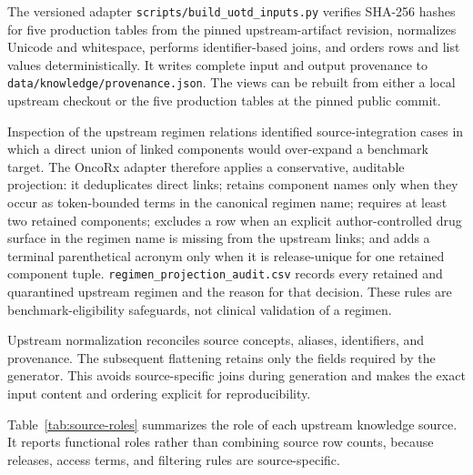 \documentclass[conference]{IEEEtran}
\newcommand{\code}[1]{\texttt{#1}}
\newcommand{\kbadj}{upstream-artifact}
\newcommand{\kbadj}{UOTD}
\begin{document}
The versioned adapter \code{scripts/build\_uotd\_inputs.py} verifies SHA-256
hashes for five production tables from the pinned \kbadj{} revision, normalizes
Unicode and whitespace, performs identifier-based joins, and orders rows and
list values deterministically. It writes complete input and output provenance
to \code{data/knowledge/provenance.json}. The views can be rebuilt from either
a local upstream checkout or the five production tables at the pinned public
commit.

Inspection of the upstream regimen relations identified source-integration cases
in which a direct union of linked components would over-expand a benchmark
target. The OncoRx adapter therefore applies a conservative, auditable
projection: it deduplicates direct links; retains component names only when
they occur as token-bounded terms in the canonical regimen name; requires at
least two retained components; excludes a row when an explicit
author-controlled drug surface in the regimen name is missing from the upstream
links; and adds a terminal parenthetical acronym only when it is release-unique
for one retained component tuple. \code{regimen\_projection\_audit.csv} records every retained
and quarantined upstream regimen and the reason for that decision. These rules are
benchmark-eligibility safeguards, not clinical validation of a regimen.

Upstream normalization reconciles source concepts, aliases, identifiers, and
provenance. The subsequent flattening retains only the fields required by the
generator. This avoids source-specific joins during generation and makes the
exact input content and ordering explicit for reproducibility.

Table~\ref{tab:source-roles} summarizes the role of each upstream knowledge
source. It reports functional roles rather than combining source row counts,
because releases, access terms, and filtering rules are source-specific.
\end{document}
